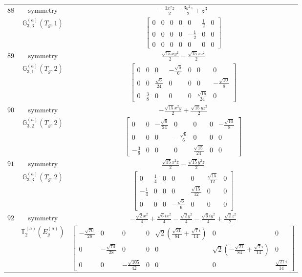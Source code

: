 \documentclass[fleqn,8pt,landscape]{jsarticle}
\begin{document}
\begin{longtable}{ccc}
$ 88 $ & $ \text{symmetry} $ & $ - \frac{3 x^{2} z}{2} - \frac{3 y^{2} z}{2} + z^{3} $ \\
$  $ & $ \mathbb{G}_{3,3}^{(a)}(T_{g},1) $ & $ \begin{bmatrix} 0 & 0 & 0 & 0 & 0 & \frac{1}{2} & 0 \\ 0 & 0 & 0 & 0 & - \frac{1}{2} & 0 & 0 \\ 0 & 0 & 0 & 0 & 0 & 0 & 0 \end{bmatrix} $ \\ \hline
$ 89 $ & $ \text{symmetry} $ & $ \frac{\sqrt{15} x y^{2}}{2} - \frac{\sqrt{15} x z^{2}}{2} $ \\
$  $ & $ \mathbb{G}_{3,1}^{(a)}(T_{g},2) $ & $ \begin{bmatrix} 0 & 0 & 0 & - \frac{\sqrt{6}}{6} & 0 & 0 & 0 \\ 0 & 0 & \frac{\sqrt{6}}{24} & 0 & 0 & 0 & - \frac{\sqrt{10}}{8} \\ 0 & \frac{3}{8} & 0 & 0 & 0 & \frac{\sqrt{15}}{24} & 0 \end{bmatrix} $ \\ \hline
$ 90 $ & $ \text{symmetry} $ & $ - \frac{\sqrt{15} x^{2} y}{2} + \frac{\sqrt{15} y z^{2}}{2} $ \\
$  $ & $ \mathbb{G}_{3,2}^{(a)}(T_{g},2) $ & $ \begin{bmatrix} 0 & 0 & - \frac{\sqrt{6}}{24} & 0 & 0 & 0 & - \frac{\sqrt{10}}{8} \\ 0 & 0 & 0 & - \frac{\sqrt{6}}{6} & 0 & 0 & 0 \\ - \frac{3}{8} & 0 & 0 & 0 & \frac{\sqrt{15}}{24} & 0 & 0 \end{bmatrix} $ \\ \hline
$ 91 $ & $ \text{symmetry} $ & $ \frac{\sqrt{15} x^{2} z}{2} - \frac{\sqrt{15} y^{2} z}{2} $ \\
$  $ & $ \mathbb{G}_{3,3}^{(a)}(T_{g},2) $ & $ \begin{bmatrix} 0 & \frac{1}{4} & 0 & 0 & 0 & \frac{\sqrt{15}}{12} & 0 \\ - \frac{1}{4} & 0 & 0 & 0 & \frac{\sqrt{15}}{12} & 0 & 0 \\ 0 & 0 & 0 & - \frac{\sqrt{6}}{6} & 0 & 0 & 0 \end{bmatrix} $ \\ \hline
$ 92 $ & $ \text{symmetry} $ & $ - \frac{\sqrt{2} x^{2}}{4} + \frac{\sqrt{6} i x^{2}}{4} - \frac{\sqrt{2} y^{2}}{4} - \frac{\sqrt{6} i y^{2}}{4} + \frac{\sqrt{2} z^{2}}{2} $ \\
$  $ & $ \mathbb{T}_{2}^{(a)}(E_{g}^{(a)}) $ & $ \begin{bmatrix} - \frac{\sqrt{70}}{28} & 0 & 0 & 0 & \sqrt{2} \left(\frac{\sqrt{21}}{84} + \frac{\sqrt{7} i}{14}\right) & 0 & 0 \\ 0 & - \frac{\sqrt{70}}{28} & 0 & 0 & 0 & \sqrt{2} \left(- \frac{\sqrt{21}}{84} + \frac{\sqrt{7} i}{14}\right) & 0 \\ 0 & 0 & - \frac{\sqrt{105}}{42} & 0 & 0 & 0 & \frac{\sqrt{21} i}{14} \end{bmatrix} $ \\ \hline

\end{longtable}
\end{document}
